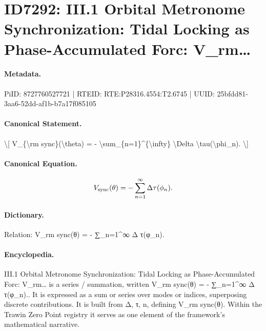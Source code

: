 \section*{ID7292: III.1 Orbital Metronome Synchronization: Tidal Locking as Phase-Accumulated Forc: V\_rm…}
\paragraph{Metadata.}
PiID: 8727760527721 | RTEID: RTE:P28316.4554:T2.6745 | UUID: 25bfdd81-3aa6-52dd-af1b-b7a17f085105

\paragraph{Canonical Statement.}
\textbackslash{}[ V\_\{\textbackslash{}rm sync\}(\textbackslash{}theta) = - \textbackslash{}sum\_\{n=1\}\textasciicircum{}\{\textbackslash{}infty\} \textbackslash{}Delta \textbackslash{}tau(\textbackslash{}phi\_n). \textbackslash{}]

\paragraph{Canonical Equation.}
\[
V_{\rm sync}(\theta) = - \sum_{n=1}^{\infty} \Delta \tau(\phi_n).
\]

\paragraph{Dictionary.}
Relation: V\_rm sync(θ) = - ∑\_n=1\textasciicircum{}∞ Δ τ(φ\_n).

\paragraph{Encyclopedia.}
III.1 Orbital Metronome Synchronization: Tidal Locking as Phase-Accumulated Forc: V\_rm… is a series / summation, written V\_rm sync(θ) = - ∑\_n=1\textasciicircum{}∞ Δ τ(φ\_n).. It is expressed as a sum or series over modes or indices, superposing discrete contributions. It is built from Δ, τ, n, defining V\_rm sync(θ). Within the Trawin Zero Point registry it serves as one element of the framework's mathematical narrative.

